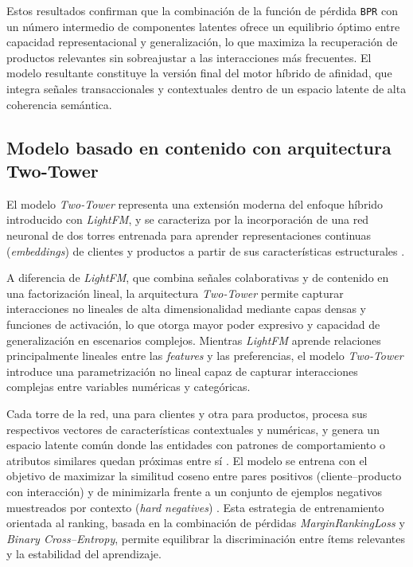 Estos resultados confirman que la combinación de la función de pérdida \texttt{BPR} con un número intermedio de componentes latentes ofrece un equilibrio óptimo entre capacidad representacional y generalización, lo que maximiza la recuperación de productos relevantes sin sobreajustar a las interacciones más frecuentes. El modelo resultante constituye la versión final del motor híbrido de afinidad, que integra señales transaccionales y contextuales dentro de un espacio latente de alta coherencia semántica.

\subsection{Modelo basado en contenido con arquitectura Two-Tower}

El modelo \textit{Two-Tower} representa una extensión moderna del enfoque híbrido introducido con \textit{LightFM}, y se caracteriza por la incorporación de una red neuronal de dos torres entrenada para aprender representaciones continuas (\textit{embeddings}) de clientes y productos a partir de sus características estructurales \cite{ARTICLE:Huang2013}.  

A diferencia de \textit{LightFM}, que combina señales colaborativas y de contenido en una factorización lineal, la arquitectura \textit{Two-Tower} permite capturar interacciones no lineales de alta dimensionalidad mediante capas densas y funciones de activación, lo que otorga mayor poder expresivo y capacidad de generalización en escenarios complejos. Mientras \textit{LightFM} aprende relaciones principalmente lineales entre las \textit{features} y las preferencias, el modelo \textit{Two-Tower} introduce una parametrización no lineal capaz de capturar interacciones complejas entre variables numéricas y categóricas.  

Cada torre de la red, una para clientes y otra para productos, procesa sus respectivos vectores de características contextuales y numéricas, y genera un espacio latente común donde las entidades con patrones de comportamiento o atributos similares quedan próximas entre sí \cite{ARTICLE:Huang2013,WEB:TFR2021}. El modelo se entrena con el objetivo de maximizar la similitud coseno entre pares positivos (cliente–producto con interacción) y de minimizarla frente a un conjunto de ejemplos negativos muestreados por contexto (\textit{hard negatives}) \cite{ARTICLE:Yi2019}. 
Esta estrategia de entrenamiento orientada al ranking, basada en la combinación de pérdidas \textit{MarginRankingLoss} y \textit{Binary Cross–Entropy}, permite equilibrar la discriminación entre ítems relevantes y la estabilidad del aprendizaje.

